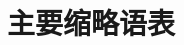 \chapter*{主要缩略语表}
\ifdefined\HCode\else{}\fi
\pagestyle{mystyle}

\small

\ifdefined\HCode
  \newcommand{\catrow}[1]{\textbf{\textit{#1}} & & \\}
\else
  \newcommand{\catrow}[1]{\multicolumn{3}{l}{\textit{#1}} \\}
\fi

\ifdefined\HCode
  \renewcommand{\addlinespace}[1][]{}%
